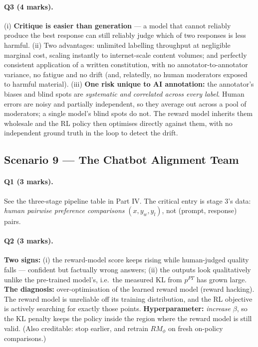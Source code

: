\documentclass[11pt,a4paper]{article}
\begin{document}
\paragraph{Q3 (4 marks).}
(i) \textbf{Critique is easier than generation} --- a model that cannot
reliably produce the best response can still reliably judge which of two
responses is less harmful.
(ii) Two advantages: unlimited labelling throughput at negligible marginal
cost, scaling instantly to internet-scale content volumes; and perfectly
consistent application of a written constitution, with no
annotator-to-annotator variance, no fatigue and no drift (and, relatedly, no
human moderators exposed to harmful material).
(iii) \textbf{One risk unique to AI annotation:} the annotator's biases and
blind spots are \emph{systematic and correlated across every label}. Human
errors are noisy and partially independent, so they average out across a pool
of moderators; a single model's blind spots do not. The reward model inherits
them wholesale and the RL policy then optimises directly against them, with no
independent ground truth in the loop to detect the drift.

\subsection{Scenario 9 --- The Chatbot Alignment Team}

\paragraph{Q1 (3 marks).} See the three-stage pipeline table in Part IV. The
critical entry is stage 3's data: \emph{human pairwise preference comparisons}
$(x,y_w,y_l)$, not (prompt, response) pairs.

\paragraph{Q2 (3 marks).} \textbf{Two signs:} (i) the reward-model score keeps
rising while human-judged quality falls --- confident but factually wrong
answers; (ii) the outputs look qualitatively unlike the pre-trained model's,
i.e.\ the measured KL from $p^{PT}$ has grown large. \textbf{The diagnosis:}
over-optimisation of the learned reward model (reward hacking). The reward
model is unreliable off its training distribution, and the RL objective is
actively searching for exactly those points. \textbf{Hyperparameter:}
\emph{increase} $\beta$, so the KL penalty keeps the policy inside the region
where the reward model is still valid. (Also creditable: stop earlier, and
retrain $RM_\phi$ on fresh on-policy comparisons.)
\end{document}

